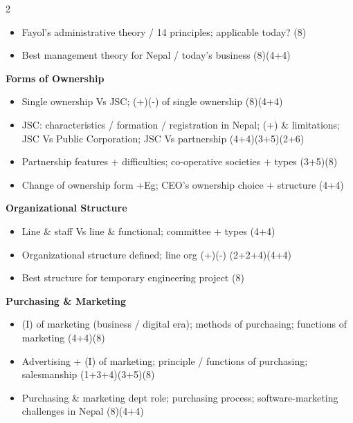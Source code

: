 \documentclass[10pt]{article}
\begin{document}
\begin{multicols}{2}
\begin{itemize}
  \item Fayol's administrative theory / 14 principles; applicable today? \hfill (8)
  \item Best management theory for Nepal / today's business \hfill (8)(4+4)
\end{itemize}
\textbf{Forms of Ownership}
\begin{itemize}
  \item Single ownership Vs JSC; (+)(-) of single ownership \hfill (8)(4+4)
  \item JSC: characteristics / formation / registration in Nepal; (+) \& limitations; JSC Vs Public Corporation; JSC Vs partnership \hfill (4+4)(3+5)(2+6)
  \item Partnership features + difficulties; co-operative societies + types \hfill (3+5)(8)
  \item Change of ownership form +Eg; CEO's ownership choice + structure \hfill (4+4)
\end{itemize}
\textbf{Organizational Structure}
\begin{itemize}
  \item Line \& staff Vs line \& functional; committee + types \hfill (4+4)
  \item Organizational structure defined; line org (+)(-) \hfill (2+2+4)(4+4)
  \item Best structure for temporary engineering project \hfill (8)
\end{itemize}
\textbf{Purchasing \& Marketing}
\begin{itemize}
  \item (I) of marketing (business / digital era); methods of purchasing; functions of marketing \hfill (4+4)(8)
  \item Advertising + (I) of marketing; principle / functions of purchasing; salesmanship \hfill (1+3+4)(3+5)(8)
  \item Purchasing \& marketing dept role; purchasing process; software-marketing challenges in Nepal \hfill (8)(4+4)
\end{itemize}


\end{multicols}
\end{document}
